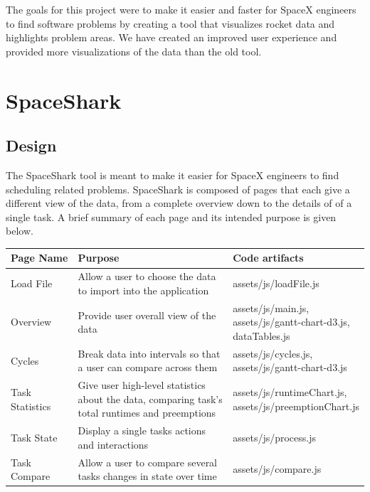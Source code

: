\documentclass{hmcclinic}
\begin{document}
The goals for this project were to make it easier and faster for SpaceX engineers to find software problems by creating a tool that visualizes rocket data and highlights problem areas. We have created an improved user experience and provided more visualizations of the data than the old tool. 
\chapter{SpaceShark}
\section{Design} %

  The SpaceShark tool is meant to make it easier for SpaceX engineers to find
  scheduling related problems.  SpaceShark is composed of pages that each give a
  different view of the data, from a complete overview down to the details of
  of a single task. A brief summary of each page and its intended purpose is
  given below.

  \begin{center}
    \begin{tabular}{p{0.2\linewidth}p{0.5\linewidth}p{0.3\linewidth}}
     \toprule
      Page Name       & Purpose & Code artifacts     \\
      \midrule
      Load File       & Allow a user to choose the data to import into the application        & assets/js/loadFile.js\\
      Overview        & Provide user overall view of the data        & assets/js/main.js, assets/js/gantt-chart-d3.js, dataTables.js\\
      Cycles          & Break data into intervals so that a user can compare across them        & assets/js/cycles.js, assets/js/gantt-chart-d3.js\\
      Task Statistics & Give user high-level statistics about the data, comparing task's total runtimes and preemptions        & assets/js/runtimeChart.js, assets/js/preemptionChart.js\\
      Task State      & Display a single tasks actions and interactions         & assets/js/process.js\\
      Task Compare    & Allow a user to compare several tasks changes in state over time     & assets/js/compare.js\\
    \bottomrule
    \end{tabular}
  \end{center}
\end{document}
